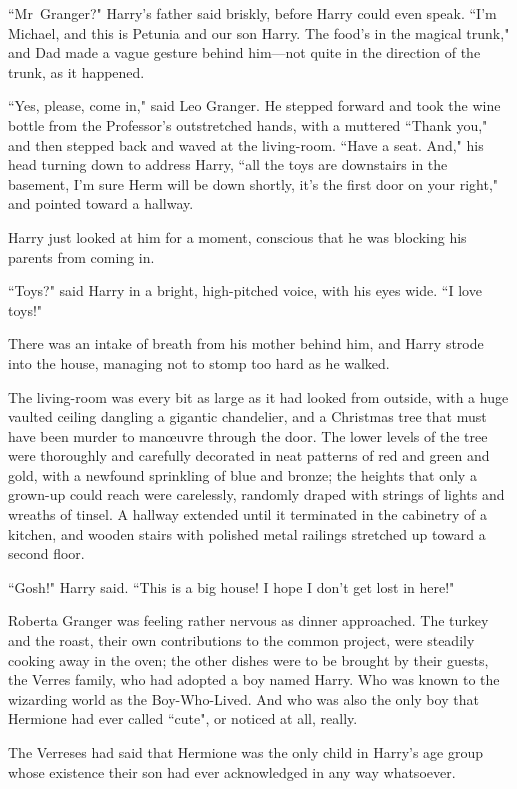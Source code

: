 ``Mr~Granger?" Harry's father said briskly, before Harry could even speak. ``I'm Michael, and this is Petunia and our son Harry. The food's in the magical trunk," and Dad made a vague gesture behind him—not quite in the direction of the trunk, as it happened.

``Yes, please, come in," said Leo Granger. He stepped forward and took the wine bottle from the Professor's outstretched hands, with a muttered ``Thank you," and then stepped back and waved at the living-room. ``Have a seat. And," his head turning down to address Harry, ``all the toys are downstairs in the basement, I'm sure Herm will be down shortly, it's the first door on your right," and pointed toward a hallway.

Harry just looked at him for a moment, conscious that he was blocking his parents from coming in.

``Toys?" said Harry in a bright, high-pitched voice, with his eyes wide. ``I love toys!"

There was an intake of breath from his mother behind him, and Harry strode into the house, managing not to stomp too hard as he walked.

The living-room was every bit as large as it had looked from outside, with a huge vaulted ceiling dangling a gigantic chandelier, and a Christmas tree that must have been murder to manœuvre through the door. The lower levels of the tree were thoroughly and carefully decorated in neat patterns of red and green and gold, with a newfound sprinkling of blue and bronze; the heights that only a grown-up could reach were carelessly, randomly draped with strings of lights and wreaths of tinsel. A hallway extended until it terminated in the cabinetry of a kitchen, and wooden stairs with polished metal railings stretched up toward a second floor.

``Gosh!" Harry said. ``This is a big house! I hope I don't get lost in here!"

\later

Roberta Granger was feeling rather nervous as dinner approached. The turkey and the roast, their own contributions to the common project, were steadily cooking away in the oven; the other dishes were to be brought by their guests, the Verres family, who had adopted a boy named Harry. Who was known to the wizarding world as the Boy-Who-Lived. And who was also the only boy that Hermione had ever called ``cute", or noticed at all, really.

The Verreses had said that Hermione was the only child in Harry's age group whose existence their son had ever acknowledged in any way whatsoever.

